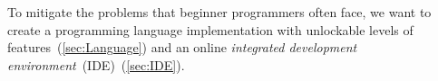 To mitigate the problems that beginner programmers often face, we want to
create a programming language implementation with unlockable levels of
features~(\autoref{sec:Language}) and an online \emph{integrated development
environment}~(IDE)~(\autoref{sec:IDE}).
